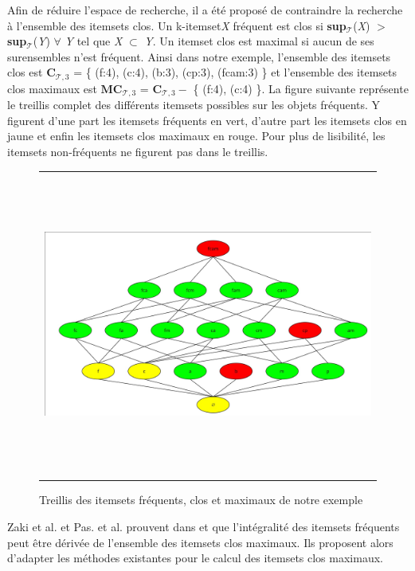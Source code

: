\documentclass[a4paper,10pt]{report}
\begin{document}
	Afin de réduire l'espace de recherche, il a été proposé de contraindre la recherche à l'ensemble des itemsets clos. Un k-itemset\emph{X} fréquent est clos si \textbf{sup$_{\mathcal{T}}$}(\emph{X}) $>$ \textbf{sup$_{\mathcal{T}}$}(\emph{Y}) $ \forall  $ \emph{Y} tel que \emph{X} $ \subset $ \emph{Y}.  Un itemset clos est maximal si aucun de ses surensembles n'est fréquent. Ainsi dans notre exemple, l'ensemble des itemsets clos est   $\textbf{C}_{\mathcal{T},3}$ = \{ (f:4), (c:4), (b:3), (cp:3), (fcam:3) \} et l'ensemble des itemsets clos maximaux est  $\textbf{MC}_{\mathcal{T},3}$ =  $\textbf{C}_{\mathcal{T},3} - $ \{ (f:4), (c:4) \}. La figure suivante représente le treillis complet des différents itemsets possibles sur les objets fréquents. Y figurent d'une part les itemsets fréquents en vert, d'autre part les itemsets clos en jaune et enfin les itemsets clos maximaux en rouge. Pour plus de lisibilité, les itemsets non-fréquents ne figurent pas dans le treillis.\\

\begin{figure}
	\begin{adjustwidth}{-2.7cm}{}
	\begin{tabular}{l}
	\includegraphics[width=12cm,height=10cm]{./img/treillis_is.jpg}\\
	\end{tabular}
	\caption{\label{fig:text}Treillis des itemsets fréquents, clos et maximaux de notre exemple}
	\end{adjustwidth}
\end{figure}

Zaki et al. et Pas. et al. prouvent dans \cite{ZAK99} et \cite{PAS99} que l'intégralité des itemsets fréquents peut être dérivée de l'ensemble des itemsets clos maximaux. Ils proposent alors d'adapter les méthodes existantes pour le calcul des itemsets clos maximaux. 
\end{document}
